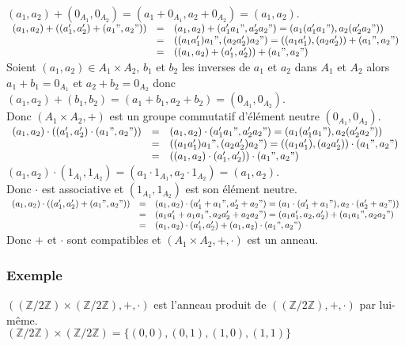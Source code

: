 \documentclass[a4paper,10pt]{book} %
\newcommand{\Z}{\mathbb{Z}}
\begin{document}
$(a_1,a_2)+(0_{A_1},0_{A_2})=(a_1+ 0_{A_1},a_2+ 0_{A_2})=(a_1,a_2)$.\\

$\begin{array}{rcl}(a_1,a_2)+((a_1',a_2')+(a_1",a_2"))&=&
(a_1,a_2)+(a_1'a_1",a_2'a_2")=
(a_1(a_1'a_1"),a_2(a_2'a_2"))\\
&=& ((a_1a_1')a_1",(a_2a_2')a_2")=
((a_1a_1'),(a_2a_2'))+(a_1",a_2")\\
&=& ((a_1,a_2)+(a_1',a_2'))+(a_1",a_2")\end{array}$\\

Soient $(a_1,a_2)\in A_1\times A_2$, $b_1$ et $b_2$ les inverses de $a_1$ et $a_2$ dans $A_1$ et $A_2$ alors $a_1+b_1=0_{A_1}$ et $a_2+b_2=0_{A_2}$ donc $(a_1,a_2)+(b_1,b_2)=(a_1+b_1,a_2+b_2)=(0_{A_1},0_{A_2})$.\\

Donc $(A_1\times A_2,+)$ est un groupe commutatif d'élément neutre $(0_{A_1},0_{A_2})$.\\

$\begin{array}{rcl}(a_1,a_2)\cdot((a_1',a_2')\cdot(a_1",a_2"))&=&
(a_1,a_2)\cdot(a_1'a_1",a_2'a_2")=
(a_1(a_1'a_1"),a_2(a_2'a_2"))\\
&=& ((a_1a_1')a_1",(a_2a_2')a_2")=
((a_1a_1'),(a_2a_2'))\cdot(a_1",a_2")\\
&=& ((a_1,a_2)\cdot(a_1',a_2'))\cdot(a_1",a_2")\end{array}$\\
$(a_1,a_2)\cdot(1_{A_1},1_{A_2})=(a_1\cdot 1_{A_1},a_2\cdot 1_{A_2})=(a_1,a_2)$.\\
Donc $\cdot$ est associative et $(1_{A_1},1_{A_2})$ est son élément neutre.\\

$\begin{array}{rcl}(a_1,a_2)\cdot ((a_1',a_2')+(a_1",a_2"))&=&(a_1,a_2)\cdot (a_1'+a_1",a_2'+a_2")=(a_1\cdot(a_1'+a_1"),a_2\cdot(a_2'+a_2"))\\&=&(a_1a_1'+a_1a_1",a_2a_2'+a_2a_2")=(a_1a_1',a_2,a_2')+(a_1a_1",a_2a_2")\\&=& (a_1,a_2)\cdot (a_1',a_2')+(a_1,a_2)\cdot (a_1",a_2")\end{array}$
Donc $+$ et $\cdot$ sont compatibles et $(A_1\times A_2,+,\cdot)$ est un anneau.\normalsize

\subsubsection{Exemple}
$((\Z/2\Z)\times (\Z/2\Z),+,\cdot)$ est l'anneau produit de $((\Z/2\Z),+,\cdot)$ par lui-même.\\
$(\Z/2\Z)\times (\Z/2\Z)=\{(0,0),(0,1),(1,0),(1,1)\}$
\end{document}
